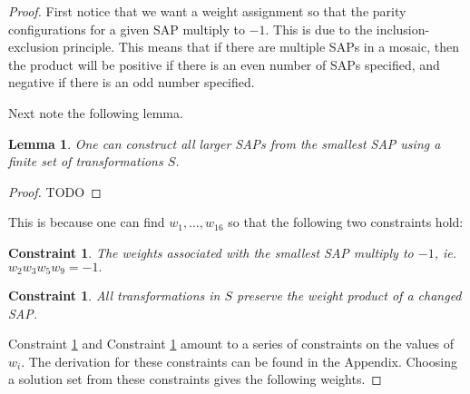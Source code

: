 \documentclass[12pt]{article}
\theoremstyle{plain}
\newtheorem{lemma}[thm]{Lemma}
\newtheorem{constraint}[thm]{Constraint}
\theoremstyle{definition}
\theoremstyle{remark}
\theoremstyle{definition}
\begin{document}
\begin{proof}
First notice that we want a weight assignment so that the parity configurations for a given SAP multiply to $-1$. This is due to the inclusion-exclusion principle. This means that if there are multiple SAPs in a mosaic, then the product will be positive if there is an even number of SAPs specified, and negative if there is an odd number specified.

Next note the following lemma.
\begin{lemma}
    \label{lemma: build bigger saps}
    One can construct all larger SAPs from the smallest SAP using a finite set of transformations $S$.
\end{lemma}

\begin{proof}
    TODO
\end{proof}

This is because one can find $w_{1} , \dots, w_{16}$ so that the following two constraints hold:

\begin{constraint}
    \label{constraint: smallest sap prod}
    The weights associated with the smallest SAP multiply to $-1$, ie. $w_2 w_3 w_5 w_9 = -1.$ 
\end{constraint}

\begin{constraint}
    \label{constraint: prod works}
    \emph{All} transformations in $S$ preserve the weight product of a changed SAP.
\end{constraint}

Constraint \ref{constraint: smallest sap prod} and Constraint \ref{constraint: prod works} amount to a series of constraints on the values of $w_i$. The derivation for these constraints can be found in the Appendix. Choosing a solution set from these constraints gives the following weights.


\end{proof}
\end{document}
